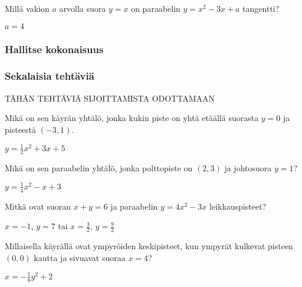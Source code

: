 \begin{tehtavasivu}
\begin{tehtava}
Millä vakion $a$ arvolla suora $y=x$ on paraabelin $y=x^2-3x+a$ tangentti?
\begin{vastaus}
$a=4$
\end{vastaus}
\end{tehtava}

\subsubsection*{Hallitse kokonaisuus}

\subsubsection*{Sekalaisia tehtäviä}

TÄHÄN TEHTÄVIÄ SIJOITTAMISTA ODOTTAMAAN

\begin{tehtava}
Mikä on sen käyrän yhtälö, jonka kukin piste on yhtä etäällä suorasta $y=0$ ja pisteestä $(-3, 1)$.
\begin{vastaus}
$y = \frac{1}{2}x^2+3 x+5$
\end{vastaus}
\end{tehtava}

\begin{tehtava}
Mikä on sen paraabelin yhtälö, jonka polttopiste on $(2, 3)$ ja johtosuora $y=1$?
\begin{vastaus}
$y = \frac{1}{4}x^2-x+3$
\end{vastaus}
\end{tehtava}

\begin{tehtava}
Mitkä ovat suoran $x+y=6$ ja paraabelin $y=4x^2-3x$ leikkauspisteet?
\begin{vastaus}
$x = -1$, $ y = 7$ tai $x = \frac{3}{2}$, $y = \frac{9}{2}$
\end{vastaus}
\end{tehtava}

\begin{tehtava}
Millaisella käyrällä ovat ympyröiden keskipisteet, kun ympyrät kulkevat pisteen $(0, 0)$ kautta ja sivuavat suoraa $x=4$?
\begin{vastaus}
$x=-\frac{1}{8}y^2+2$
\end{vastaus}
\end{tehtava}




\end{tehtavasivu}

